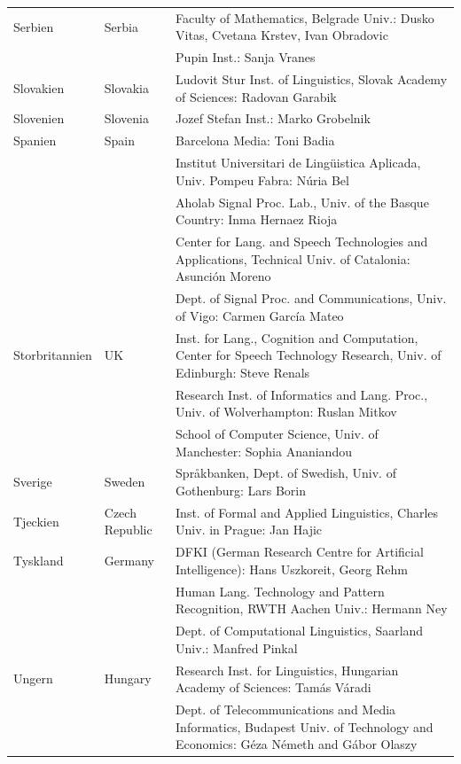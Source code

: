 \begin{longtable}{llp{105mm}}
  Serbien & \textcolor{grey1}{Serbia} & Faculty of Mathematics, Belgrade Univ.: Dusko Vitas, Cvetana Krstev, Ivan Obradovic \\ \addlinespace
  & & Pupin Inst.: Sanja Vranes \\ \addlinespace  
  Slovakien & \textcolor{grey1}{Slovakia} & Ludovit Stur Inst. of Linguistics, Slovak Academy of Sciences: Radovan Garabik \\ \addlinespace 
  Slovenien & \textcolor{grey1}{Slovenia} & Jozef Stefan Inst.: Marko Grobelnik \\ \addlinespace 
  Spanien & \textcolor{grey1}{Spain} & Barcelona Media: Toni Badia \\ \addlinespace 
  & & Institut Universitari de Lingüistica Aplicada, Univ. Pompeu Fabra: Núria Bel \\ \addlinespace 
  & & Aholab Signal Proc. Lab., Univ. of the Basque Country: Inma Hernaez Rioja \\ \addlinespace 
  & & Center for Lang. and Speech Technologies and Applications, Technical Univ. of Catalonia: Asunción Moreno \\ \addlinespace 
  & & Dept. of Signal Proc. and Communications, Univ. of Vigo: Carmen García Mateo \\ \addlinespace 
  Storbritannien & \textcolor{grey1}{UK} & Inst. for Lang., Cognition and Computation, Center for Speech Technology Research, Univ. of Edinburgh: Steve Renals \\ \addlinespace 
  & & Research Inst. of Informatics and Lang. Proc., Univ. of Wolverhampton: Ruslan Mitkov \\ \addlinespace 
  & & School of Computer Science, Univ. of Manchester: Sophia Ananiandou \\ \addlinespace 
  Sverige & \textcolor{grey1}{Sweden} & Språkbanken, Dept. of Swedish, Univ. of Gothenburg: Lars Borin \\ \addlinespace 
  Tjeckien & \textcolor{grey1}{Czech Republic} & Inst. of Formal and Applied Linguistics, Charles Univ. in Prague: Jan Hajic \\ \addlinespace
  Tyskland & \textcolor{grey1}{Germany} & DFKI (German Research Centre for Artificial Intelligence): Hans Uszkoreit, Georg Rehm\\ \addlinespace
  & & Human Lang. Technology and Pattern Recognition, RWTH Aachen Univ.: Hermann Ney \\ \addlinespace
  & & Dept. of Computational Linguistics, Saarland Univ.: Manfred Pinkal\\ \addlinespace
  Ungern & \textcolor{grey1}{Hungary} & Research Inst. for Linguistics, Hungarian Academy of Sciences: Tamás Váradi\\  \addlinespace
  & & Dept. of Telecommunications and Media Informatics, Budapest Univ. of Technology and Economics: Géza Németh and Gábor Olaszy
\end{longtable}
\normalsize

